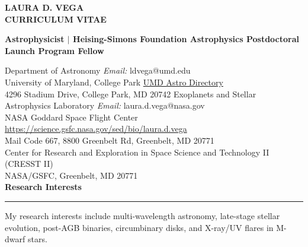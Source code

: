 \documentclass[letter,11pt]{article}
\begin{document}
\pagestyle{fancy}
\fancyhf{}
\renewcommand{\headrulewidth}{0pt}


\begin{center} 
\bfseries{
\LARGE \uppercase{Laura D. Vega} \\
\large \uppercase{Curriculum Vitae}}
\end{center}

\noindent
\begin{center}{\bf Astrophysicist \(|\) Heising-Simons Foundation Astrophysics Postdoctoral Launch Program Fellow} \\
\end{center}

\noindent Department of Astronomy \hfill \textit{Email:} ldvega@umd.edu \\
\noindent University of Maryland, College Park \hfill \href{https://www.astro.umd.edu/people/directory.html#Postdocs\%20and\%20Faculty\%20Assistants}{UMD Astro Directory}  \\
4296 Stadium Drive, College Park, MD 20742
\vskip 0.1in
\noindent Exoplanets and Stellar Astrophysics Laboratory \hfill \textit{Email:} laura.d.vega@nasa.gov
\\ 
NASA Goddard Space Flight Center \hfill
\url{https://science.gsfc.nasa.gov/sed/bio/laura.d.vega} \\
Mail Code 667, 8800 Greenbelt Rd, Greenbelt, MD 20771 \\

\noindent Center for Research and Exploration in Space Science and Technology II (CRESST II) \\ NASA/GSFC, Greenbelt, MD 20771 \\


\noindent
{\bf Research Interests} \\
\vspace{-10mm}
\begin{center}
\rule{\textwidth}{0.2mm}
\end{center}
\vspace{-3mm}
\noindent
My research interests include multi-wavelength astronomy, late-stage stellar evolution, post-AGB binaries, circumbinary disks, and X-ray/UV flares in M-dwarf stars.
\end{document}
